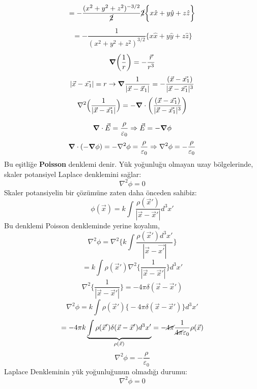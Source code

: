 \begin{tcolorbox}
\begin{align*}
\end{align*}
\begin{align*}
    = - \dfrac{(x^{2} + y^{2} + z^{2})^{-3/2}}{\cancel{2}} \cancel{2} \bigg\{ x \hat{x} + y \hat{y} + z \hat{z} \bigg\} 
\end{align*}
\begin{align*}
    = - \dfrac{1}{(x^{2} + y^{2} + z^{2})^{3/2}} \bigg\{ x \hat{x} + y \hat{y} + z \hat{z} \bigg\} 
\end{align*}
\begin{align*}
\grad (\dfrac{1}{r})= -\dfrac{\Vec{r}}{r^{3}}
\end{align*}
\begin{align*}
|\Vec{x} - \Vec{x_{1}}| = r \rightarrow \grad \dfrac{1}{|\Vec{x} - \Vec{x}_{1}|}= - \dfrac{(\Vec{x} - \Vec{x_{1}})}{|\Vec{x} - \Vec{x_{1}}|^{3}}
\end{align*}
\begin{align*}
 \nabla^{2} \Big( \dfrac{1}{|\Vec{x} - \Vec{x_{1}}|} \Big) = - \grad \cdot \bigg( \dfrac{(\Vec{x} - \Vec{x_{1}})}{|\Vec{x} - \Vec{x_{1}}|^{3}} \bigg)
\end{align*}
\end{tcolorbox}

\newpage

\begin{definition}
\[ \grad \cdot \Vec{E} = \dfrac{\rho}{\varepsilon_{0}} \Rightarrow \Vec{E} = - \grad \phi \] 
\[ \grad \cdot (- \grad \phi ) = -\nabla^{2} \phi = \dfrac{\rho}{\varepsilon_{0}} \Rightarrow \nabla^{2} \phi = - \dfrac{\rho}{\varepsilon_{0}} \]
Bu eşitliğe \textbf{Poisson} denklemi denir. Yük yoğunluğu olmayan uzay bölgelerinde, skaler potansiyel Laplace denklemini sağlar:
\[ \nabla^{2} \phi = 0 \tag{1.29} \]
Skaler potansiyelin bir çözümüne zaten daha önceden sahibiz:
\[ \phi (\Vec{x}) = k \int \dfrac{\rho (\Vec{x}')}{|\Vec{x} - \Vec{x}'|} d^{3}x' \]
Bu denklemi Poisson denkleminde yerine koyalım,
\[ \nabla^{2} \phi = \nabla^{2} \bigg\{ k \int \dfrac{\rho (\Vec{x}') d^{3} x' }{|\Vec{x} - \Vec{x'}|} \bigg\} \]
\[ = k \int \rho(\Vec{x}') \nabla^{2} \bigg\{ \dfrac{1}{|\Vec{x} - \Vec{x}'|} \bigg\} d^{3}x' \]
\[ \nabla^{2} \bigg\{ \dfrac{1}{|\Vec{x} - \Vec{x}'|}   \bigg\} = - 4 \pi \delta (\Vec{x} - \Vec{x}') \]
\[ \nabla^{2} \phi = k \int  \rho (\Vec{x}')  \bigg\{ -4 \pi \delta (\Vec{x} - \Vec{x}') \bigg\} d^{3}x' \]
\[ = - 4 \pi k \underbrace{\int \rho (\Vec{x}') \delta (\Vec{x} - \Vec{x}' ) d^{3}x'}_{\rho (\Vec{x})} = - \cancel{4 \pi} \dfrac{1}{\cancel{4 \pi}  \varepsilon_{0}} \rho(\Vec{x})  \]
\[ \nabla^{2} \phi = - \dfrac{\rho}{\varepsilon_{0}}  \tag{1.28}\]
Laplace Denkleminin yük yoğunluğunun olmadığı durumu:
\[ \nabla^{2} \phi = 0 \tag{1.29}\]
\end{definition}



